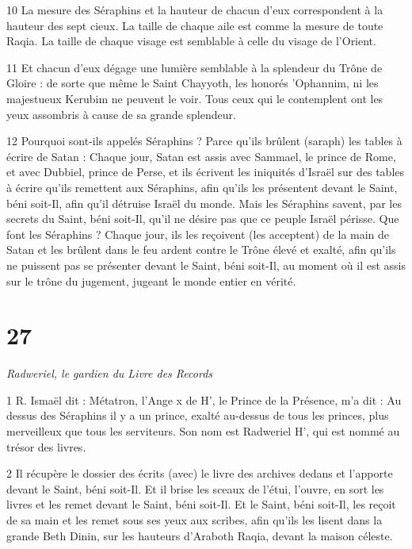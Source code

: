 \par 10 La mesure des Séraphins et la hauteur de chacun d'eux correspondent à la hauteur des sept cieux. La taille de chaque aile est comme la mesure de toute Raqia. La taille de chaque visage est semblable à celle du visage de l’Orient.

\par 11 Et chacun d'eux dégage une lumière semblable à la splendeur du Trône de Gloire : de sorte que même le Saint Chayyoth, les honorés 'Ophannim, ni les majestueux Kerubim ne peuvent le voir. Tous ceux qui le contemplent ont les yeux assombris à cause de sa grande splendeur.

\par 12 Pourquoi sont-ils appelés Séraphins ? Parce qu'ils brûlent (saraph) les tables à écrire de Satan : Chaque jour, Satan est assis avec Sammael, le prince de Rome, et avec Dubbiel, prince de Perse, et ils écrivent les iniquités d'Israël sur des tables à écrire qu'ils remettent aux Séraphins, afin qu'ils les présentent devant le Saint, béni soit-Il, afin qu'il détruise Israël du monde. Mais les Séraphins savent, par les secrets du Saint, béni soit-Il, qu'il ne désire pas que ce peuple Israël périsse. Que font les Séraphins ? Chaque jour, ils les reçoivent (les acceptent) de la main de Satan et les brûlent dans le feu ardent contre le Trône élevé et exalté, afin qu'ils ne puissent pas se présenter devant le Saint, béni soit-Il, au moment où il est assis sur le trône du jugement, jugeant le monde entier en vérité.



\chapter{27}

\par \textit{Radweriel, le gardien du Livre des Records}

\par 1 R. Ismaël dit : Métatron, l'Ange x de H', le Prince de la Présence, m'a dit : Au dessus des Séraphins il y a un prince, exalté au-dessus de tous les princes, plus merveilleux que tous les serviteurs. Son nom est Radweriel H', qui est nommé au trésor des livres.

\par 2 Il récupère le dossier des écrits (avec) le livre des archives dedans et l'apporte devant le Saint, béni soit-Il. Et il brise les sceaux de l'étui, l'ouvre, en sort les livres et les remet devant le Saint, béni soit-Il. Et le Saint, béni soit-Il, les reçoit de sa main et les remet sous ses yeux aux scribes, afin qu'ils les lisent dans la grande Beth Dinin, sur les hauteurs d'Araboth Raqia, devant la maison céleste.

